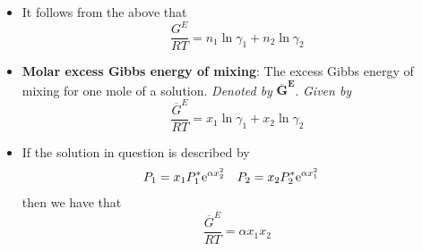 \documentclass[../notes.tex]{subfiles}
\begin{document}
\begin{itemize}
\begin{equation*}
    \end{equation*}
    \item It follows from the above that
    \begin{equation*}
        \frac{G^E}{RT} = n_1\ln\gamma_1+n_2\ln\gamma_2
    \end{equation*}
    \item \textbf{Molar excess Gibbs energy of mixing}: The excess Gibbs energy of mixing for one mole of a solution. \emph{Denoted by} $\bm{\overline{G}^E}$. \emph{Given by}
    \begin{equation*}
        \frac{\overline{G}^E}{RT} = x_1\ln\gamma_1+x_2\ln\gamma_2
    \end{equation*}
    \item If the solution in question is described by
    \begin{align*}
        P_1 &= x_1P_1^*\e[\alpha x_2^2]&
        P_2 &= x_2P_2^*\e[\alpha x_1^2]
    \end{align*}
    then we have that
    \begin{equation*}
        \frac{\overline{G}^E}{RT} = \alpha x_1x_2
    \end{equation*}
\end{itemize}
\end{document}
